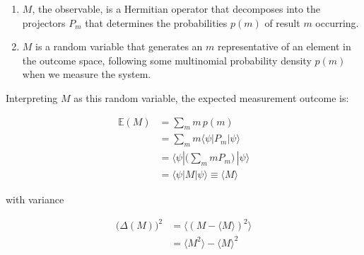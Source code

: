 \documentclass{article}
\theoremstyle{definition}
\begin{document}
      \begin{enumerate}
        \item $M$, the observable, is a Hermitian operator that decomposes into the projectors $P_m$ that determines the probabilities $p(m)$ of result $m$ occurring.
        \item $M$ is a random variable that generates an $m$ representative of an element in the outcome space, following some multinomial probability density $p(m)$ when we measure the system.
      \end{enumerate}

      Interpreting $M$ as this random variable, the expected measurement outcome is:

      \begin{align*}
        \mathbb{E}(M) & = \sum_m m\, p(m) \\
        & = \sum_m m \langle \psi | P_m | \psi \rangle \\
        & = \langle \psi | \bigg( \sum_m m P_m \bigg) \, | \psi \rangle \\
        & = \langle \psi | M | \psi \rangle \equiv \langle M \rangle
      \end{align*}

      with variance

      \begin{align*}
        \big( \Delta (M)\big)^2 & = \langle (M - \langle M \rangle )^2 \rangle \\
        & = \langle M^2 \rangle - \langle M \rangle^2
      \end{align*}
\end{document}
